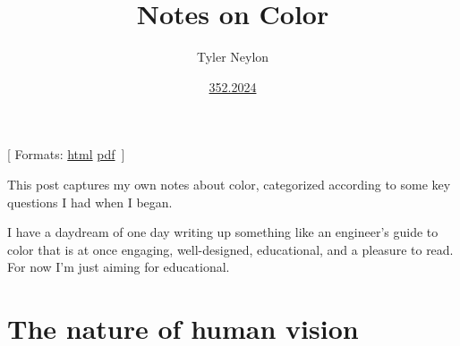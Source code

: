 \documentclass[
]{article}
\title{Notes on Color}
\author{Tyler Neylon}
\date{\href{https://tylerneylon.com/a/7date/}{352.2024}}
\newcommand{\class}[1]{}
\newcommand{\optquad}{\quad}
\newcommand{\smallscrneg}{}
\newcommand{\smallscr}[1]{}
\newcommand{\bigscr}[1]{#1}
\newcommand{\smallscrskip}[1]{}
\begin{document}
\maketitle

\newcommand{\R}{\mathbb{R}}
\newcommand{\N}{\mathbb{N}}
\newcommand{\eqnset}[1]{\left.\mbox{$#1$}\;\;\right\rbrace\class{postbrace}{ }}
\providecommand{\latexonlyrule}[3][]{}
\providecommand{\optquad}{\class{optquad}{}}
\providecommand{\smallscrneg}{\class{smallscrneg}{ }}
\providecommand{\bigscr}[1]{\class{bigscr}{#1}}
\providecommand{\smallscr}[1]{\class{smallscr}{#1}}
\providecommand{\smallscrskip}[1]{\class{smallscrskip}{\hskip #1}}

\newcommand{\mydots}{{\cdot}\kern -0.1pt{\cdot}\kern -0.1pt{\cdot}}

\newcommand{\?}{\stackrel{?}{=}}
\newcommand{\sign}{\textsf{sign}}
\newcommand{\order}{\textsf{order}}
\newcommand{\flips}{\textsf{flips}}
\newcommand{\samecycles}{\textsf{same$\\\_$cycles}}
\newcommand{\canon}{\textsf{canon}}
\newcommand{\cs}{\mathsf{cs}}
\newcommand{\dist}{\mathsf{dist}}
\renewcommand{\theenumi}{(\roman{enumi})}

{[} Formats:
\href{http://tylerneylon.com/a/color_notes/color_notes.html}{html}
\textbar{}
\href{http://tylerneylon.com/a/color_notes/color_notes.pdf}{pdf}
\(\,\){]}

This post captures my own notes about color, categorized according to
some key questions I had when I began.

I have a daydream of one day writing up something like an engineer's
guide to color that is at once engaging, well-designed, educational, and
a pleasure to read. For now I'm just aiming for educational.

\hypertarget{the-nature-of-human-vision}{%
\section{The nature of human vision}\label{the-nature-of-human-vision}}
\end{document}
